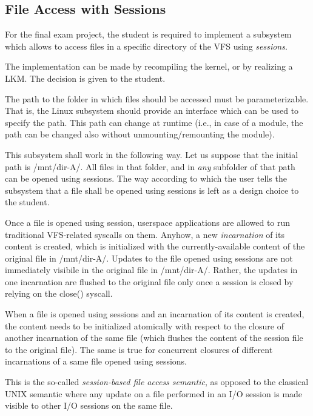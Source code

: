 \subsection*{File Access with Sessions}

For the final exam project, the student is required to implement a subsystem which allows to access files in a specific directory of the V\+FS using {\itshape sessions}.

The implementation can be made by recompiling the kernel, or by realizing a L\+KM. The decision is given to the student.

The path to the folder in which files should be accessed must be parameterizable. That is, the Linux subsystem should provide an interface which can be used to specify the path. This path can change at runtime (i.\+e., in case of a module, the path can be changed also without unmounting/remounting the module).

This subsystem shall work in the following way. Let us suppose that the initial path is {\ttfamily /mnt/dir-\/\+A/}. All files in that folder, and in {\itshape any} subfolder of that path can be opened using sessions. The way according to which the user tells the subsystem that a file shall be opened using sessions is left as a design choice to the student.

Once a file is opened using session, userspace applications are allowed to run traditional V\+F\+S-\/related syscalls on them. Anyhow, a new {\itshape incarnation} of its content is created, which is initialized with the currently-\/available content of the original file in {\ttfamily /mnt/dir-\/\+A/}. Updates to the file opened using sessions are not immediately visibile in the original file in {\ttfamily /mnt/dir-\/\+A/}. Rather, the updates in one incarnation are flushed to the original file only once a session is closed by relying on the {\ttfamily close()} syscall.

When a file is opened using sessions and an incarnation of its content is created, the content needs to be initialized atomically with respect to the closure of another incarnation of the same file (which flushes the content of the session file to the original file). The same is true for concurrent closures of different incarnations of a same file opened using sessions.

This is the so-\/called {\itshape session-\/based file access semantic}, as opposed to the classical U\+N\+IX semantic where any update on a file performed in an I/O session is made visible to other I/O sessions on the same file.

